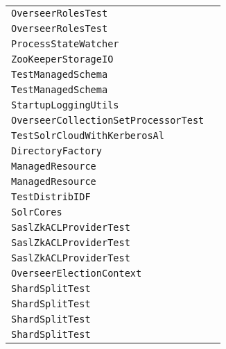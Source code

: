 \begin{center}
\begin{tabular}{ll}
\lstinline/OverseerRolesTest/&\raisebox{0pt}{\lstinline/setOverseerRole(CloudSolr)/}\\
\lstinline/OverseerRolesTest/&\raisebox{0pt}{\lstinline/setOverseerRole(CloudSolr)/}\\
\lstinline/ProcessStateWatcher/&\raisebox{0pt}{\lstinline/process(WatchedEventevent)/}\\
\lstinline/ZooKeeperStorageIO/&\raisebox{0pt}{\lstinline/delete(String)/}\\
\lstinline/TestManagedSchema/&\raisebox{0pt}{\lstinline/testPersistUniqueKey()/}\\
\lstinline/TestManagedSchema/&\raisebox{0pt}{\lstinline/testPersistUniqueKey()/}\\
\lstinline/StartupLoggingUtils/&\raisebox{0pt}{\lstinline/logNotSupported(String)/}\\
\lstinline/OverseerCollectionSetProcessorTest/&\raisebox{0pt}{\lstinline/testTemplate(Integer)/}\\
\lstinline/TestSolrCloudWithKerberosAl/&\raisebox{0pt}{\lstinline/setupMiniKdc()/}\\
\lstinline/DirectoryFactory/&\raisebox{0pt}{\lstinline/cleanupOldIndexDirectories(String)/}\\
\lstinline/ManagedResource/&\raisebox{0pt}{\lstinline/doPut(BaseSolrResource)/}\\
\lstinline/ManagedResource/&\raisebox{0pt}{\lstinline/doPut(BaseSolrResource)/}\\
\lstinline/TestDistribIDF/&\raisebox{0pt}{\lstinline/addDocsRandomly()=/}\\
\lstinline/SolrCores/&\raisebox{0pt}{\lstinline/waitForLoadingCoreToFinish(String)/}\\
\lstinline/SaslZkACLProviderTest/&\raisebox{0pt}{\lstinline/setUp()/}\\
\lstinline/SaslZkACLProviderTest/&\raisebox{0pt}{\lstinline/setUp()/}\\
\lstinline/SaslZkACLProviderTest/&\raisebox{0pt}{\lstinline/setUp()/}\\
\lstinline/OverseerElectionContext/&\raisebox{0pt}{\lstinline/runLeaderProcess()/}\\ 
\lstinline/ShardSplitTest/&\raisebox{0pt}{\lstinline/logDebugHelp(int[])/}\\
\lstinline/ShardSplitTest/&\raisebox{0pt}{\lstinline/logDebugHelp(int[])/}\\
\lstinline/ShardSplitTest/&\raisebox{0pt}{\lstinline/logDebugHelp(int[])/}\\
\lstinline/ShardSplitTest/&\raisebox{0pt}{\lstinline/logDebugHelp(int[])/}\\

\end{tabular}
\end{center}
